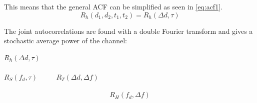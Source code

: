 This means that the general ACF can be simplified as seen in \autoref{eq:acf1}.
\begin{equation}\label{eq:acf1}
R_{h}(d_1,d_2,t_1,t_2) = R_{h}(\Delta d,\tau) 
\end{equation}
\begin{where}
\end{where}

The joint autocorrelations are found with a double Fourier transform and gives a stochastic average power of the channel:

\begin{center}
$R_h(\Delta d,\tau)$\\
\\
$R_S(f_{d},\tau)$ $\quad \quad$ $R_T(\Delta d,\Delta f)$\\
\\
\vspace{-1.9em}
\begin{equation}
R_H(f_{d},\Delta f)
\label{AutocorrDouble}
\end{equation}
\end{center}

